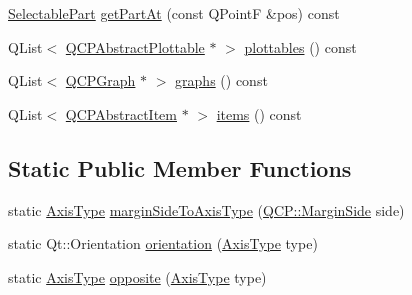 \begin{DoxyCompactItemize}
\item 
\hyperlink{classQCPAxis_abee4c7a54c468b1385dfce2c898b115f}{\-Selectable\-Part} \hyperlink{classQCPAxis_ab2965a8ab1da948b897f1c006080760b}{get\-Part\-At} (const \-Q\-Point\-F \&pos) const 
\item 
\-Q\-List$<$ \hyperlink{classQCPAbstractPlottable}{\-Q\-C\-P\-Abstract\-Plottable} $\ast$ $>$ \hyperlink{classQCPAxis_a4f7404494cccdbfc00e1e865b7ed16a4}{plottables} () const 
\item 
\-Q\-List$<$ \hyperlink{classQCPGraph}{\-Q\-C\-P\-Graph} $\ast$ $>$ \hyperlink{classQCPAxis_ad3919e7d7400f55446ea82018fe5e3a8}{graphs} () const 
\item 
\-Q\-List$<$ \hyperlink{classQCPAbstractItem}{\-Q\-C\-P\-Abstract\-Item} $\ast$ $>$ \hyperlink{classQCPAxis_ae437656a5fd1a03721a8f2d7aab460fe}{items} () const 
\end{DoxyCompactItemize}
\subsection*{\-Static \-Public \-Member \-Functions}
\begin{DoxyCompactItemize}
\item 
static \hyperlink{classQCPAxis_ae2bcc1728b382f10f064612b368bc18a}{\-Axis\-Type} \hyperlink{classQCPAxis_ac0a6b77bd52bec6c81cd62d167cfeba6}{margin\-Side\-To\-Axis\-Type} (\hyperlink{namespaceQCP_a7e487e3e2ccb62ab7771065bab7cae54}{\-Q\-C\-P\-::\-Margin\-Side} side)
\item 
static \-Qt\-::\-Orientation \hyperlink{classQCPAxis_a9a68b3e45f1b1e33d4d807822342516c}{orientation} (\hyperlink{classQCPAxis_ae2bcc1728b382f10f064612b368bc18a}{\-Axis\-Type} type)
\item 
static \hyperlink{classQCPAxis_ae2bcc1728b382f10f064612b368bc18a}{\-Axis\-Type} \hyperlink{classQCPAxis_aa85ba73dfee6483e23825461b725e363}{opposite} (\hyperlink{classQCPAxis_ae2bcc1728b382f10f064612b368bc18a}{\-Axis\-Type} type)
\end{DoxyCompactItemize}
